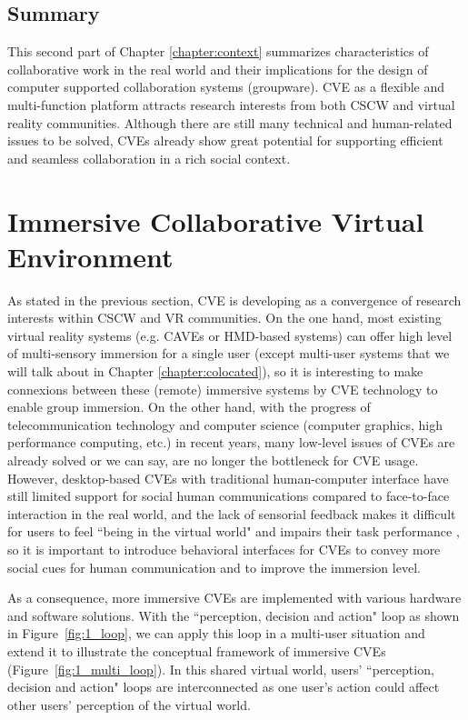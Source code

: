 \subsection{Summary}
This second part of Chapter \ref{chapter:context} summarizes characteristics of collaborative work in the real world and their implications for the design of computer supported collaboration systems (groupware). CVE as a flexible and multi-function platform attracts research interests from both CSCW and virtual reality communities. Although there are still many technical and human-related issues to be solved, CVEs already show great potential for supporting efficient and seamless collaboration in a rich social context.


\newpage

\section{Immersive Collaborative Virtual Environment}
As stated in the previous section, CVE is developing as a convergence of research interests within CSCW and VR communities. On the one hand, most existing virtual reality systems (e.g. CAVEs or HMD-based systems) can offer high level of multi-sensory immersion for a single user (except multi-user systems that we will talk about in Chapter \ref{chapter:colocated}), so it is interesting to make connexions between these (remote) immersive systems by CVE technology to enable group immersion. On the other hand, with the progress of telecommunication technology and computer science (computer graphics, high performance computing, etc.) in recent years, many low-level issues of CVEs are already solved or we can say, are no longer the bottleneck for CVE usage. However, desktop-based CVEs with traditional human-computer interface have still limited support for social human communications compared to face-to-face interaction in the real world, and the lack of sensorial feedback makes it difficult for users to feel ``being in the virtual world" and impairs their task performance \citep{Narayan2005Quantifying, Nam2008Roles}, so it is important to introduce behavioral interfaces for CVEs to convey more social cues for human communication and to improve the immersion level.

As a consequence, more immersive CVEs are implemented with various hardware and software solutions. With the ``perception, decision and action" loop as shown in Figure~\ref{fig:1_loop}, we can apply this loop in a multi-user situation and extend it to illustrate the conceptual framework of immersive CVEs (Figure~\ref{fig:1_multi_loop}). In this shared virtual world, users' ``perception, decision and action" loops are interconnected as one user's action could affect other users' perception of the virtual world.

